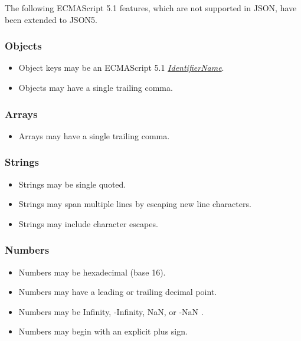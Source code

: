 \documentclass{article}
\newcommand{\token}[1]{\emph{#1}}
\newcommand{\esref}[2]{\href{http://www.ecma-international.org/ecma-262/5.1/\#sec-#2}{#1}}
\begin{document}
The following ECMAScript 5.1 features, which are not supported in JSON, have
been extended to JSON5.

\subsubsection*{Objects}

\begin{itemize}
	\item Object keys may be an ECMAScript 5.1 \esref{\token{IdentifierName}}{7.6}.
	\item Objects may have a single trailing comma.
\end{itemize}

\subsubsection*{Arrays}

\begin{itemize}
	\item Arrays may have a single trailing comma.
\end{itemize}

\subsubsection*{Strings}

\begin{itemize}
	\item Strings may be single quoted.
	\item Strings may span multiple lines by escaping new line characters.
	\item Strings may include character escapes.
\end{itemize}

\subsubsection*{Numbers}

\begin{itemize}
	\item Numbers may be hexadecimal (base 16).
	\item Numbers may have a leading or trailing decimal point.
	\item Numbers may be Infinity, -Infinity, NaN, or -NaN \cite{float}.
	\item Numbers may begin with an explicit plus sign.
\end{itemize}
\end{document}
